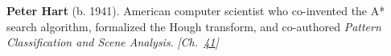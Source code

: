 \textbf{Peter Hart} (b. 1941). American computer scientist who co-invented the A* search algorithm, formalized the Hough transform, and co-authored \emph{Pattern Classification and Scene Analysis}. \emph{[Ch.~\hyperref[ch:hough]{41}]}

